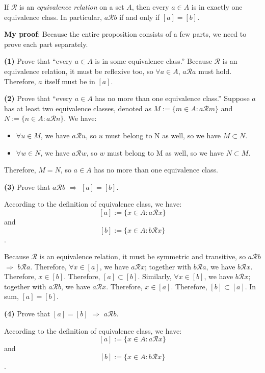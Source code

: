 \documentclass[12pt, letterpaper, oneside]{book}
\begin{document}
If $\mathcal{R}$ is an \textit{equivalence relation} on a set $A$, then every
$a \in A$ is in exactly one equivalence class. In particular, $a \mathcal{R} b$
if and only if $[a] = [b]$.

\colorbox{lime!100}{\textbf{My proof}}: Because the entire proposition consists
of a few parts, we need to prove each part separately.

\textbf{(1)} Prove that ``every $a \in A$ is in some equivalence class.''
Because $\mathcal{R}$ is an equivalence relation, it must be reflexive too, so
$\forall a \in A$, $a \mathcal{R} a$ must hold. Therefore, $a$ itself must be
in $[a]$.

\textbf{(2)} Prove that ``every $a \in A$ has no more than one equivalence
class.'' Suppose $a$ has at least two equivalence classes, denoted as $M := \{
  m \in A: a \mathcal{R} m\}$ and $N := \{n \in A: a \mathcal{R} n\}$. We have:

\begin{itemize}
  \item $\forall u \in M$, we have $a \mathcal{R} u$, so $u$ must belong to N
        as well, so we have $M \subset N$.
  \item $\forall w \in N$, we have $a \mathcal{R} w$, so $w$ must belong to M
        as well, so we have $N \subset M$.
\end{itemize}

Therefore, $M = N$, so $a \in A$ has no more than one equivalence class.

\textbf{(3)} Prove that $a \mathcal{R} b$ $\Rightarrow$ $[a] = [b]$.

According to the definition of equivalence class, we have: \[[a] := \{x \in A:
  a \mathcal{R} x\}\] and \[[b] := \{x \in A: b \mathcal{R} x\}\].

Because $\mathcal{R}$ is an equivalence relation, it must be symmetric and
transitive, so $a \mathcal{R} b$ $\Rightarrow$ $b \mathcal{R} a$. Therefore,
$\forall x \in [a]$, we have $a \mathcal{R} x$; together with $b \mathcal{R} a$,
we have $b \mathcal{R} x$. Therefore, $x \in [b]$. Therefore, $[a] \subset [b]$.
Similarly, $\forall x \in [b]$, we have $b \mathcal{R} x$; together with $a
  \mathcal{R} b$, we have $a \mathcal{R} x$. Therefore, $x \in [a]$. Therefore,
$[b] \subset [a]$. In sum, $[a] = [b]$.

\textbf{(4)} Prove that $[a] = [b]$ $\Rightarrow$ $a \mathcal{R} b$.

According to the definition of equivalence class, we have: \[[a] := \{x \in A:
  a \mathcal{R} x\}\] and \[[b] := \{x \in A: b \mathcal{R} x\}\].
\end{document}
